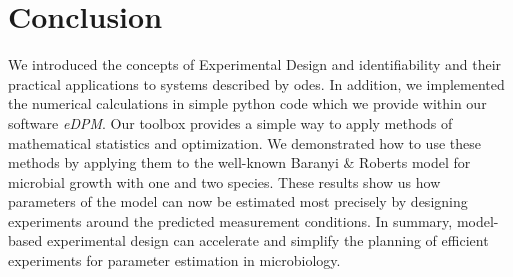 \documentclass[graybox]{svmult}
\begin{document}
\section*{Conclusion}
We introduced the concepts of Experimental Design and identifiability and their practical applications to systems described by \acp{ode}.
In addition, we implemented the numerical calculations in simple python code which we provide within our software {\it eDPM}.
Our toolbox provides a simple way to apply methods of mathematical statistics and optimization.
We demonstrated how to use these methods by applying them to the well-known Baranyi \& Roberts model for microbial growth with one and two species.
These results show us how parameters of the model can now be estimated most precisely by designing experiments around the predicted measurement conditions.
In summary, model-based experimental design can accelerate and simplify the planning of efficient experiments for parameter estimation in microbiology.
%
%
%
\end{document}
